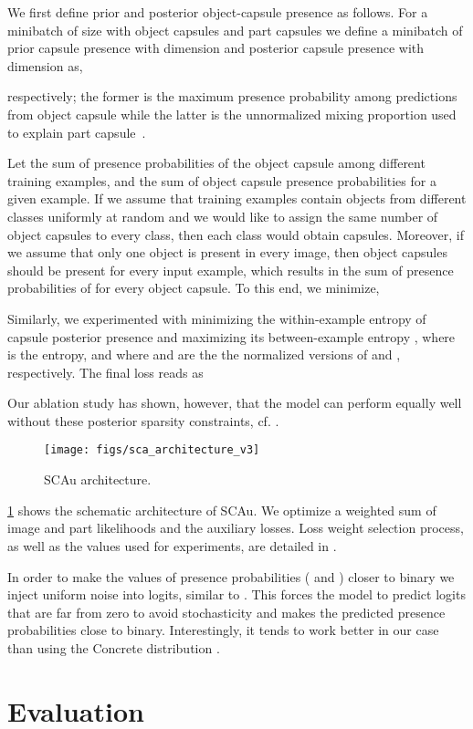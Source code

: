 \documentclass{article}
\begin{document}
We first define prior and posterior object-capsule presence as follows.
For a minibatch of size {\small} with {\small} object capsules and  part capsules we define a minibatch of prior capsule presence  with dimension {\small} and posterior capsule presence  with dimension {\small} as,

respectively; the former is the maximum presence probability among predictions from object capsule  while the latter is the unnormalized mixing proportion used to explain part capsule~.
\begin{description}[leftmargin=\parindent]
	\item[Prior sparsity]
	Let  the sum of presence probabilities of the object capsule  among different training examples, and  the sum of object capsule presence probabilities for a given example.
	If we assume that training examples contain objects from different classes uniformly at random and we would like to assign the same number of object capsules to every class, then each class would obtain  capsules.
	Moreover, if we assume that only one object is present in every image, then  object capsules should be present for every input example, which results in the sum of presence probabilities of  for every object capsule.
	To this end, we minimize, 
	
	\item[Posterior Sparsity]
	Similarly, we experimented with minimizing the within-example entropy of capsule posterior presence  and maximizing its between-example entropy , where  is the entropy, and where  and  are the the normalized versions of  
	and , respectively.
	The final loss reads as
	
	Our ablation study has shown, however, that the model can perform equally well without these posterior sparsity constraints, cf. .
\end{description}
\begin{figure}
	\centering
	\texttt{[image: figs/sca\_architecture\_v3]}
	\caption{\gls{SCAu} architecture.}
	\label{fig:sca_arch}
\end{figure}
\cref{fig:sca_arch} shows the schematic architecture of \gls{SCAu}. We optimize a weighted sum of image and part likelihoods and the auxiliary losses. 
Loss weight selection process, as well as the values used for experiments, are detailed in .

In order to make the values of presence probabilities ( and ) closer to binary we inject uniform noise  into logits, similar to \cite{Tieleman2014thesis}.
This forces the model to predict logits that are far from zero to avoid stochasticity and makes the predicted presence probabilities close to binary.
Interestingly, it tends to work better in our case than using the Concrete distribution \citep{Maddison2017concrete}. \section{Evaluation}
\label{sec:experiments}
\end{document}
